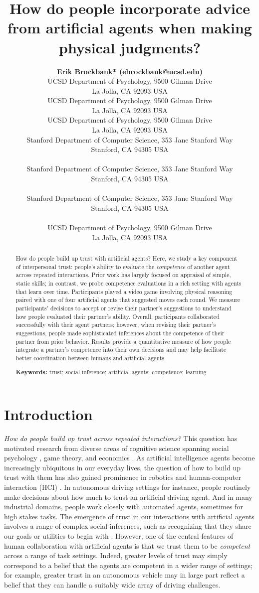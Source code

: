 \documentclass[10pt,letterpaper]{article}
\title{How do people incorporate advice from artificial agents when making physical judgments?}
\author{
  {
  \large \bf Erik Brockbank* (ebrockbank@ucsd.edu)} \\
  UCSD Department of Psychology, 9500 Gilman Drive \\
  La Jolla, CA 92093 USA
  \AND {\large \bf Haoliang Wang* (haw027@ucsd.edu)} \\
  UCSD Department of Psychology, 9500 Gilman Drive \\
  La Jolla, CA 92093 USA
  \AND {\large \bf Justin Yang (juy003@ucsd.edu)} \\
  UCSD Department of Psychology, 9500 Gilman Drive \\
  La Jolla, CA 92093 USA
  \AND {\large \bf Suvir Mirchandani (suvir@cs.stanford.edu)} \\
  Stanford Department of Computer Science, 353 Jane Stanford Way \\
  Stanford, CA 94305 USA \\
  \AND {\large \bf Erdem Biyik (ebiyik@stanford.edu)} \\
  Stanford Department of Computer Science, 353 Jane Stanford Way \\
  Stanford, CA 94305 USA \\
  \AND {\large \bf Dorsa Sadigh (dorsa@cs.stanford.edu)} \\
  Stanford Department of Computer Science, 353 Jane Stanford Way \\
  Stanford, CA 94305 USA \\
  \AND {\large \bf Judith Fan (jefan@ucsd.edu)} \\
  UCSD Department of Psychology, 9500 Gilman Drive \\
  La Jolla, CA 92093 USA \\
}
\begin{document}
\maketitle


\begin{abstract}
How do people build up trust with artificial agents? Here, we study a key component of interpersonal trust: people's ability to evaluate the \textit{competence} of another agent across repeated interactions. Prior work has largely focused on appraisal of simple, static skills; in contrast, we probe competence evaluations in a rich setting with agents that learn over time. Participants played a video game involving physical reasoning paired with one of four artificial agents that suggested moves each round. We measure participants' decisions to accept or revise their partner's suggestions to understand how people evaluated their partner's ability. Overall, participants collaborated successfully with their agent partners; however, when revising their partner's suggestions, people made sophisticated inferences about the competence of their partner from prior behavior. Results provide a quantitative measure of how people integrate a partner's competence into their own decisions and may help facilitate better coordination between humans and artificial agents.

\textbf{Keywords:} 
trust; social inference; artificial agents; competence; learning 
\end{abstract}


\section{Introduction}

\textit{How do people build up trust across repeated interactions?} This question has motivated research from diverse areas of cognitive science spanning social psychology \cite{simpson2007psychological, deutsch1973resolution}, game theory, and economics \cite{camerer1988experimental, berg1995trust}. As artificial intelligence agents become increasingly ubiquitous in our everyday lives, the question of how to build up trust with them has also gained prominence in robotics and human-computer interaction (HCI) \cite{soh2020multi, chen2020trust}. 
In autonomous driving settings for instance, people routinely make decisions about how much to trust an artificial driving agent. And in many industrial domains, people work closely with automated agents, sometimes for high stakes tasks. The emergence of trust in our interactions with artificial agents involves a range of complex social inferences, such as recognizing that they share our goals or utilities to begin with \cite{serrino2019finding}. However, one of the central features of human collaboration with artificial agents is that we trust them to be \textit{competent} across a range of task settings. Indeed, greater levels of trust may simply correspond to a belief that the agents are competent in a wider range of settings; for example, greater trust in an autonomous vehicle may in large part reflect a belief that they can handle a suitably wide array of driving challenges.
\end{document}
